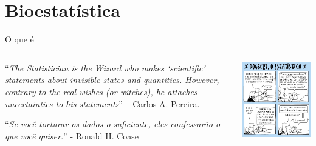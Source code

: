 \documentclass{beamer}
\begin{document}
\section{Bioestatística}

\begin{frame}{O que é}
  \begin{columns}
    \begin{column}{7cm}
      \begin{block}{}
        {\scriptsize ``{\em The Statistician is the Wizard who makes
            `scientific' statements about invisible states and
            quantities. However, contrary to the real wishes (or
            witches), he attaches uncertainties to his statements}'' –
          Carlos A.  Pereira.}
      \end{block}
      \begin{block}{}
        {\scriptsize ``{\em Se você torturar os dados o suficiente,
            eles confessarão o que você quiser.}'' - Ronald H. Coase}
      \end{block}

    \end{column}
    \begin{column}{3cm}
      \begin{center}
        \includegraphics[width=1.6\textwidth]{Intro/dilbert}
      \end{center}
    \end{column}
  \end{columns}
\end{frame}
\end{document}
